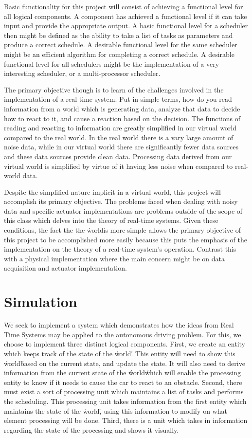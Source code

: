 \documentclass{article} %
\begin{document}
Basic functionality for this project will consist of achieving a functional level for all logical components.
A component has achieved a functional level if it can take input and provide the appropriate output.
A basic functional level for a scheduler then might be defined as the ability to take a list of tasks as parameters and produce a correct schedule.
A desirable functional level for the same scheduler might be an efficient algorithm for completing a correct schedule.
A desirable functional level for all schedulers might be the implementation of a very interesting scheduler, or a multi-processor scheduler.

The primary objective though is to learn of the challenges involved in the implementation of a real-time system.
Put in simple terms, how do you read information from a world which is generating data, analyze that data to decide how to react to it, and cause a reaction based on the decision.
The functions of reading and reacting to information are greatly simplified in our virtual world compared to the real world.
In the real world there is a vary large amount of noise data, while in our virtual world there are significantly fewer data sources and these data sources provide clean data.
Processing data derived from our virtual world is simplified by virtue of it having less noise when compared to real-world data.

Despite the simplified nature implicit in a virtual world, this project will accomplish its primary objective.
The problems faced when dealing with noisy data and specific actuator implementations are problems outside of the scope of this class which delves into the theory of real-time systems.
Given these conditions, the fact the the \'world\' is more simple allows the primary objective of this project to be accomplished more easily because this puts the emphasis of the implementation on the theory of a real-time system's operation.
Contrast this with a physical implementation where the main concern might be on data acquisition and actuator implementation.

%
%
\section{Simulation}
We seek to implement a system which demonstrates how the ideas from Real Time Systems may be applied to the autonomous driving problem.
For this, we choose to implement three distinct logical components.
First, we create an entity which keeps track of the state of the \'world\'. This entity will need to show this \'world\' based on the current state, and update the state. It will also need to derive information from the current state of the \'world\' which will enable the processing entity to know if it needs to cause the car to react to an obstacle.
Second, there must exist a sort of processing unit which maintains a list of tasks and performs the scheduling. This processing unit takes information from the first entity which maintains the state of the \'world\', using this information to modify on what element  processing will be done.
Third, there is a unit which takes in information regarding the state of the processing and shows it visually.
\end{document}
